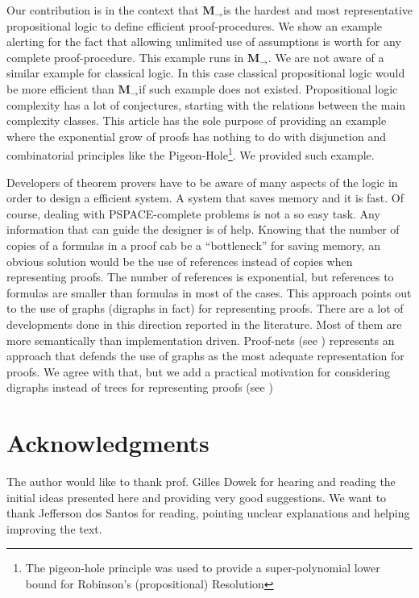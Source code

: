 \documentclass[11pt]{llncs}
\newcommand{\mil}{\ensuremath{\mathbf{M}_{\rightarrow}}}
\begin{document}
Our contribution is in the context that \mil is the hardest and most representative propositional logic to define efficient proof-procedures. We show an example alerting for the fact that allowing unlimited use of assumptions is worth for any complete proof-procedure. This example runs in \mil. We are not aware of a similar example for classical logic. In this case classical propositional logic would be more efficient than \mil if such example does not existed. Propositional logic complexity has a lot of conjectures, starting with the relations between the main complexity classes. This article has the sole purpose of providing an example where the exponential grow of proofs has nothing to do with disjunction and combinatorial principles like the Pigeon-Hole\footnote{The pigeon-hole principle was used to provide a super-polynomial lower bound for Robinson's (propositional) Resolution}. We provided such example. 

Developers of theorem provers have to be aware of many aspects of the logic in order to design a efficient system. A system that saves memory and it is fast. Of course, dealing with PSPACE-complete problems is not a so easy task. Any information that can guide the designer is of help. Knowing that the number of copies of a formulas in a proof cab be a ``bottleneck''  for saving memory, an obvious solution would be the use of references instead of copies when representing proofs. The number of references is exponential, but references to formulas are smaller than formulas in most of the cases. This approach points out to the use of graphs (digraphs in fact) for representing proofs. There are a lot of developments done in this direction reported in the literature. Most of them are more semantically than implementation driven. Proof-nets (see \cite{Girard}) represents an approach that defends the use of graphs as the most adequate representation for proofs. We agree with that, but we add a practical motivation for considering digraphs instead of trees for representing proofs (see \cite{EPTCS}) 

\section{Acknowledgments} 

The author would like to thank prof. Gilles Dowek for hearing and reading the initial ideas presented here and providing very good suggestions. We want to thank Jefferson dos Santos for reading, pointing unclear explanations and helping improving the text. 



\end{document}

